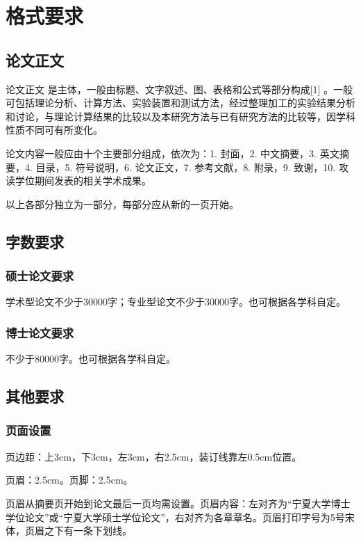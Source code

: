 \chapter{格式要求}

\section{论文正文}

论文正文 是主体，一般由标题、文字叙述、图、表格和公式等部分构成[1] 。一般可包括理论分析、计算方法、实验装置和测试方法，经过整理加工的实验结果分析和讨论，与理论计算结果的比较以及本研究方法与已有研究方法的比较等，因学科性质不同可有所变化。

论文内容一般应由十个主要部分组成，依次为：1. 封面，2. 中文摘要，3. 英文摘要，4. 目录，5. 符号说明，6. 论文正文，7. 参考文献，8. 附录，9. 致谢，10. 攻读学位期间发表的相关学术成果。

以上各部分独立为一部分，每部分应从新的一页开始。

\section{字数要求}

\subsection{硕士论文要求}

学术型论文不少于30000字；专业型论文不少于30000字。也可根据各学科自定。

\subsection{博士论文要求}

不少于80000字。也可根据各学科自定。

\section{其他要求}

\subsection{页面设置}

页边距：上3cm，下3cm，左3cm，右2.5cm，装订线靠左0.5cm位置。

页眉：2.5cm。页脚：2.5cm。

页眉从摘要页开始到论文最后一页均需设置。页眉内容：左对齐为“宁夏大学博士学位论文”或“宁夏大学硕士学位论文”，右对齐为各章章名。页眉打印字号为5号宋体，页眉之下有一条下划线。

